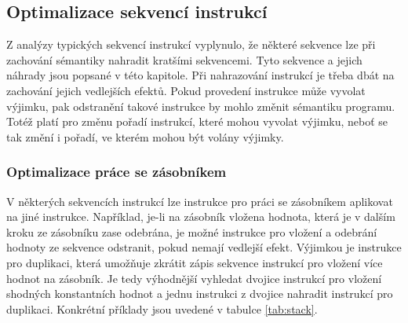 \subsection{Optimalizace sekvencí instrukcí}

Z analýzy typických sekvencí instrukcí vyplynulo, že některé sekvence lze při zachování sémantiky nahradit kratšími sekvencemi.
Tyto sekvence a jejich náhrady jsou popsané v této kapitole.
Při nahrazování instrukcí je třeba dbát na zachování jejich vedlejších efektů. Pokud provedení instrukce může vyvolat výjimku, pak odstranění takové instrukce by mohlo změnit sémantiku programu. Totéž platí pro změnu pořadí instrukcí, které mohou vyvolat výjimku, neboť se tak změní i pořadí, ve kterém mohou být volány výjimky.

\subsubsection{Optimalizace práce se zásobníkem}

V některých sekvencích instrukcí lze instrukce pro práci se zásobníkem aplikovat na jiné instrukce. Například, je-li na zásobník vložena hodnota, která je v dalším kroku ze zásobníku zase odebrána, je možné instrukce pro vložení a odebrání hodnoty ze sekvence odstranit, pokud nemají vedlejší efekt. Výjimkou je instrukce pro duplikaci, která umožňuje zkrátit zápis sekvence instrukcí pro vložení více hodnot na zásobník. Je tedy výhodnější vyhledat dvojice instrukcí pro vložení shodných konstantních hodnot a jednu instrukci z dvojice nahradit instrukcí pro duplikaci. Konkrétní příklady jsou uvedené v tabulce \ref{tab:stack}.


